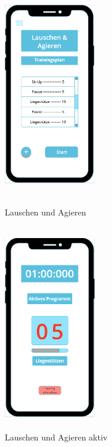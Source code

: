 \documentclass[a4paper,12pt]{article}
\begin{document}
\begin{figure}[ht!]
	
	\centering
	\begin{minipage}{0.4\textwidth}
		\includegraphics[width=4cm,height=9cm]{./Benutzeroberflaeche/Lauschen_und_Agieren.png}
		\caption{Lauschen und Agieren}
		\vspace{30px}
	\end{minipage}
	\hfill
	\begin{minipage}{0.4\textwidth}
		\includegraphics[width=4cm,height=9cm]{./Benutzeroberflaeche/Lauschen_und_Agieren_aktiv.png}
		\caption{Lauschen und Agieren aktiv}
		\vspace{30px}
	\end{minipage}
	\begin{minipage}{0.4\textwidth}

\end{minipage}
\end{figure}
\end{document}
